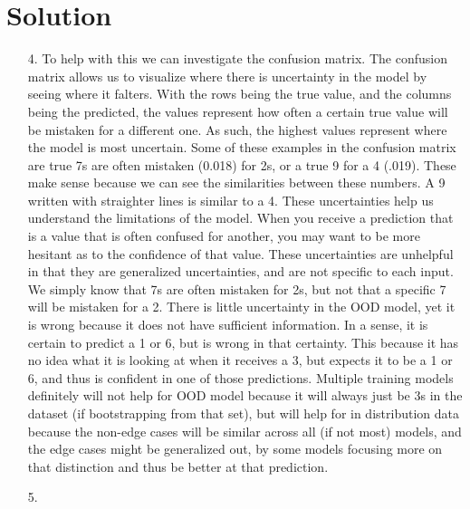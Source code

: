 \documentclass[submit]{harvardml}
\newenvironment{answer}
  {\section*{Solution}}
{}
\begin{document}
\begin{answer}
\begin{enumerate}
    \item[4.] To help with this we can investigate the confusion matrix. The confusion matrix allows us to visualize where there is uncertainty in the model by seeing where it falters. With the rows being the true value, and the columns being the predicted, the values represent how often a certain true value will be mistaken for a different one. As such, the highest values represent where the model is most uncertain. Some of these examples in the confusion matrix are true 7s are often mistaken (0.018) for 2s, or a true 9 for a 4 (.019). These make sense because we can see the similarities between these numbers. A 9 written with straighter lines is similar to a 4.  These uncertainties help us understand the limitations of the model. When you receive a prediction that is a value that is often confused for another, you may want to be more hesitant as to the confidence of that value. These uncertainties are unhelpful in that they are generalized uncertainties, and are not specific to each input. We simply know that 7s are often mistaken for 2s, but not that a specific 7 will be mistaken for a 2. There is little uncertainty in the OOD model, yet it is wrong because it does not have sufficient information. In a sense, it is certain to predict a 1 or 6, but is wrong in that certainty. This because it has no idea what it is looking at when it receives a 3, but expects it to be a 1 or 6, and thus is confident in one of those predictions. Multiple training models definitely will not help for OOD model because it will always just be 3s in the dataset (if bootstrapping from that set), but will help for in distribution data because the non-edge cases will be similar across all (if not most) models, and the edge cases might be generalized out, by some models focusing more on that distinction and thus be better at that prediction. 

    \item[5.]


\end{enumerate}
\end{answer}
\end{document}
